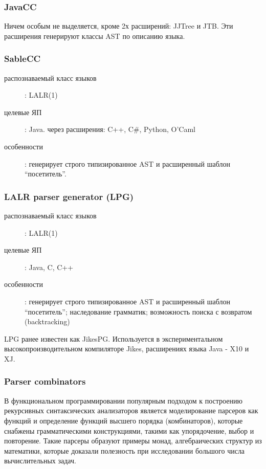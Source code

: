 \documentclass[a4paper,12pt]{article}
\begin{document}
\subsubsection{JavaCC}
Ничем особым не выделяется, кроме 2х расширений: JJTree
и JTB. Эти расширения генерируют классы AST по описанию языка.

\subsubsection{SableCC}
\begin{description}
  \item[распознаваемый класс языков]: LALR(1)
  \item[целевые ЯП]: Java. через расширения: C++, C\#, Python, O'Caml
  \item[особенности]: генерирует строго типизированное AST и расширенный
 	шаблон ``посетитель''.
\end{description}

\subsubsection{LALR parser generator (LPG)}
\begin{description}
  \item[распознаваемый класс языков]: LALR(1)
  \item[целевые ЯП]: Java, C, C++
  \item[особенности]: генерирует строго типизированное AST и расширенный
 	шаблон ``посетитель''; наследование грамматик; возможность поиска с возвратом
 	(backtracking)
\end{description}

LPG ранее известен как JikesPG. Используется в экспериментальном
высокопроизводительном компиляторе Jikes, расширениях языка Java - X10 и XJ.

\subsubsection{Parser combinators}
В функциональном программировании популярным подходом к построению рекурсивных
синтаксических анализаторов является моделирование парсеров как функций и
определение функций высшего порядка (комбинаторов), которые снабжены
грамматическими конструкциями, такими как упорядочение, выбор и повторение.
Такие парсеры образуют примеры монад, алгебраических структур из математики,
которые доказали полезность при исследовании большого числа вычислительных
задач.
\end{document}
